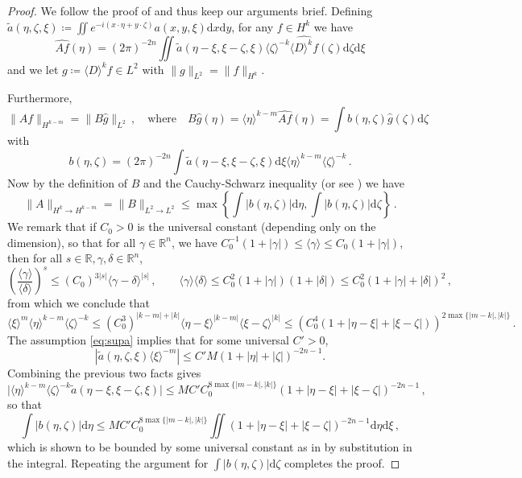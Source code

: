 \documentclass[11pt]{amsart}
\theoremstyle{definition}
\numberwithin{equation}{section}
\newcommand{\mR}{\mathbb{R}}                    %
\newcommand{\abs}[1]{\lvert #1 \rvert}          %
\newcommand{\norm}[1]{\lVert #1 \rVert}         %
\newcommand{\dd}{\mathrm{d}}
\begin{document}
\begin{proof}
	We follow the proof of \cite[Thm.~A.1]{zbMATH01116206} and thus keep our arguments brief. Defining $\tilde{a}(\eta,\zeta,\xi) \coloneqq \iint e^{-i(x\cdot\eta+y\cdot\zeta)}a(x,y,\xi)\dd x\dd y$, for any $f\in H^k$ we have 
	\[
		\widehat{Af}(\eta) %
		 =  (2\pi)^{-2n}\iint \tilde{a}(\eta-\xi,\xi-\zeta,\xi) \langle \zeta\rangle^{-k} \widehat{\langle D\rangle^k f}(\zeta)\dd\zeta\dd\xi
	\]
	and we let $g \coloneqq  \langle D\rangle^k f \in L^2$ with $\norm{g}_{L^2} = \norm{f}_{H^k}$. 

	Furthermore,
	\[
		\norm{Af}_{H^{k-m}} = %
		\norm{B\hat g}_{L^2}\,,\quad\text{where}\quad 	B\hat g(\eta) = \langle \eta\rangle^{k-m} \widehat{Af}(\eta) = \int b(\eta,\zeta) \hat g(\zeta)\dd \zeta
	\]
	with 
	\[
		b(\eta,\zeta) = (2\pi)^{-2n} \int \tilde{a}(\eta-\xi,\xi-\zeta,\xi)\dd\xi \langle \eta\rangle^{k-m} \langle \zeta\rangle^{-k}\,.
	\]
	Now by the definition of $B$ and the Cauchy-Schwarz inequality (or see \cite[Prop.~0.5.A]{MR1121019}) we have
	\[
		\norm{A}_{H^k\to H^{k-m}} = \norm{B}_{L^2 \to L^2} \leq \max\left\{\int \abs{b(\eta,\zeta)}\dd\eta, \int \abs{b(\eta,\zeta)}\dd\zeta\right\}\,.
	\]
	We remark that if $C_0>0$ is the universal constant (depending only on the dimension), so that for all $\gamma\in\mR^n$, we have $C_0^{-1} (1+\abs{\gamma})\leq \langle \gamma \rangle \leq C_0(1+\abs{\gamma})$, then for all $s\in \mR, \gamma,\delta\in\mR^n$,
	\[
		\left(\frac{\langle \gamma\rangle}{\langle \delta\rangle}\right)^s \leq (C_0)^{3\abs{s}}\langle \gamma-\delta\rangle^{\abs{s}}\,, \qquad \langle\gamma\rangle\langle\delta\rangle \leq C_0^2 (1+\abs{\gamma})(1+\abs{\delta}) \leq C_0^2(1+\abs{\gamma}+\abs{\delta})^2\,,
	\]
	from which we conclude that 
	\[
		\langle \xi \rangle^{m} \langle \eta\rangle^{k-m} \langle \zeta\rangle^{-k}\leq (C_0^3)^{\abs{k-m}+\abs{k}}\langle \eta-\xi\rangle^{\abs{k-m}}\langle \xi-\zeta\rangle^{\abs{k}} \leq \left(C_0^4 (1+\abs{\eta-\xi}+\abs{\xi-\zeta})\right)^{2\max\{\abs{m-k},\abs{k}\}}\,.
	\]
    The assumption \eqref{eq:supa} implies that for some universal $C'>0$, 
    \[
        |\tilde{a}(\eta,\zeta,\xi)\langle \xi \rangle^{-m}| \leq C' M(1+|\eta|+|\zeta|)^{-2n-1}.
    \]
	Combining the previous two facts gives 
	\[
		\abs{\langle \eta\rangle^{k-m} \langle \zeta\rangle^{-k} \tilde{a}(\eta-\xi,\xi-\zeta,\xi)} \leq MC'C_0^{8\max\{\abs{m-k},\abs{k}\}}(1+\abs{\eta-\xi}+\abs{\xi-\zeta})^{-2n-1}\,,
	\]
	so that
	\[
		\int \abs{b(\eta,\zeta)} \dd\eta \leq MC'C_0^{8\max\{\abs{m-k},\abs{k}\}} \iint (1+\abs{\eta-\xi}+\abs{\xi-\zeta})^{-2n-1}\dd\eta\dd\xi\,,
	\]
	which is shown to be bounded by some universal constant as in \cite[Thm.~A.1]{zbMATH01116206} by substitution in the integral. Repeating the argument for $\int \abs{b(\eta,\zeta)} \dd\zeta$ completes the proof.
\end{proof}
\end{document}
